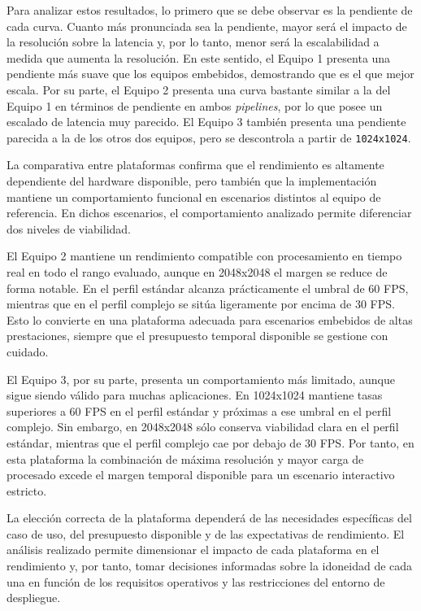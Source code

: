 Para analizar estos resultados, lo primero que se debe observar es la pendiente de cada curva. Cuanto más pronunciada sea la pendiente, mayor será el impacto de la resolución sobre la latencia y, 
por lo tanto, menor será la escalabilidad a medida que aumenta la resolución. En este sentido, el Equipo 1 presenta una pendiente más suave que los equipos embebidos, demostrando 
que es el que mejor escala. Por su parte, el Equipo 2 presenta una curva bastante similar a la del Equipo 1 en términos de pendiente en ambos \textit{pipelines}, por lo que posee un escalado de 
latencia muy parecido. El Equipo 3 también presenta una pendiente parecida a la de los otros dos equipos, pero se descontrola a partir de \texttt{1024x1024}.

\newpage

La comparativa entre plataformas confirma que el rendimiento es altamente dependiente del hardware disponible, pero también que la implementación mantiene un 
comportamiento funcional en escenarios distintos al equipo de referencia. En dichos escenarios, el comportamiento analizado permite diferenciar dos niveles de viabilidad.

El Equipo 2 mantiene un rendimiento compatible con procesamiento en tiempo real en todo el rango evaluado, 
aunque en 2048x2048 el margen se reduce de forma notable. En el perfil estándar alcanza prácticamente el umbral de 60 FPS, mientras que en el perfil complejo se sitúa ligeramente por encima de 30 
FPS. Esto lo convierte en una plataforma adecuada para escenarios embebidos de altas prestaciones, siempre que el presupuesto temporal disponible se gestione con cuidado.

El Equipo 3, por su parte, presenta un comportamiento más limitado, aunque sigue siendo válido para muchas aplicaciones. En 1024x1024 mantiene tasas superiores a 60 FPS en el perfil estándar y próximas a 
ese umbral en el perfil complejo. Sin embargo, en 2048x2048 sólo conserva viabilidad clara en el perfil estándar, mientras que el perfil complejo cae por debajo de 30 FPS. Por tanto, en esta plataforma 
la combinación de máxima resolución y mayor carga de procesado excede el margen temporal disponible para un escenario interactivo estricto.

La elección correcta de la plataforma dependerá de las necesidades específicas del caso de uso, del presupuesto disponible y de las expectativas de rendimiento. El análisis realizado permite dimensionar 
el impacto de cada plataforma en el rendimiento y, por tanto, tomar decisiones informadas sobre la idoneidad de cada una en función de los requisitos operativos y las restricciones del entorno de despliegue.
